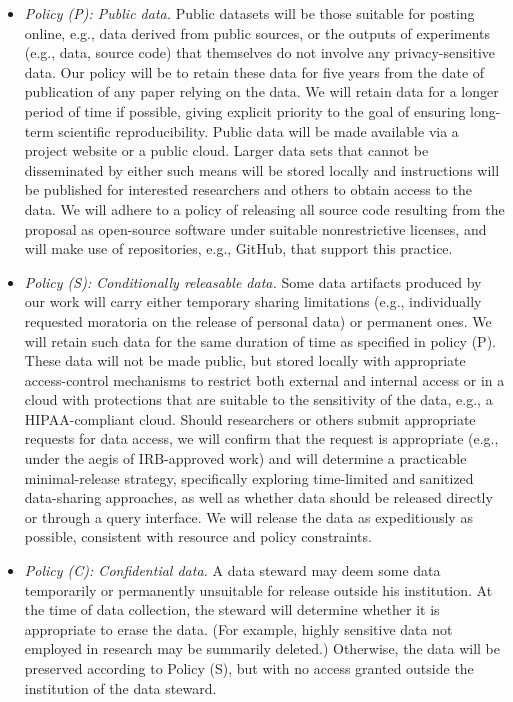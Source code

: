 \begin{itemize}

\item{\em Policy (P): Public data.} Public datasets will be those suitable for
posting online, e.g., data derived from public sources, or the outputs of
experiments (e.g., data, source code) that themselves do not involve any
privacy-sensitive data. Our policy will be to retain these data for five years
from the date of publication of any paper relying on the data. We will retain
data for a longer period of time if possible, giving explicit priority to the
goal of ensuring long-term scientific reproducibility. Public data will be made
available via a project website or a public cloud. Larger data sets that cannot
be disseminated by either such means will be stored locally and instructions
will be published for interested researchers and others to obtain access to the
data. We will adhere to a policy of releasing all source code resulting from the
proposal as open-source software under suitable nonrestrictive licenses, and
will make use of repositories, e.g., GitHub, that support this practice.

\item {\em Policy (S): Conditionally releasable data.} Some data artifacts
produced by our work will carry either temporary sharing limitations (e.g.,
individually requested moratoria on the release of personal data) or permanent
ones. We will retain such data for the same duration of time as specified in
policy (P). These data will not be made public, but stored locally with
appropriate access-control mechanisms to restrict both external and internal
access or in a cloud with protections that are suitable to the sensitivity of
the data, e.g., a HIPAA-compliant cloud. Should researchers or others submit
appropriate requests for data access, we will confirm that the request is
appropriate (e.g., under the aegis of IRB-approved work) and will determine a
practicable minimal-release strategy, specifically exploring time-limited and
sanitized data-sharing approaches, as well as whether data should be released
directly or through a query interface. We will release the data as expeditiously
as possible, consistent with resource and policy constraints.

\item {\em Policy (C): Confidential data.} A data steward may deem some data
temporarily or permanently unsuitable for release outside his institution.
%
\fi
%
At the time of data collection, the steward
will determine whether it is appropriate to erase the data. (For example, highly
sensitive data not employed in research may be summarily deleted.) Otherwise,
the data will be preserved according to Policy (S), but with no access granted
outside the institution of the data steward.


\end{itemize}
